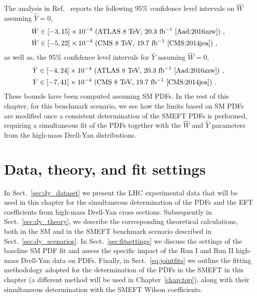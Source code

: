 \documentclass[withindex,glossary]{cam-thesis}
\begin{document}
The analysis in Ref.~\cite{Farina:2016rws} reports the following 95\% confidence level intervals on $\hat{W}$ assuming $\hat{Y}=0$,
\begin{equation}
\begin{split}
\hat W &\in \left[ - 3, 15 \right]\times 10^{-4}~\textrm{(ATLAS 8 TeV, 20.3 fb$^{-1}$~\cite{Aad:2016zzw})}~,\\
\hat W &\in \left[ - 5, 22 \right]\times 10^{-4}~\textrm{(CMS 8 TeV, 19.7 fb$^{-1}$~\cite{CMS:2014jea})}~,
\end{split}
\end{equation} 
as well as, the 95\% confidence level intervals for $\hat{Y}$ assuming $\hat{W}=0$,
\begin{equation}
\begin{split}
\hat Y &\in \left[ - 4, 24 \right]\times 10^{-4}~\textrm{(ATLAS 8 TeV, 20.3 fb$^{-1}$~\cite{Aad:2016zzw})}~,\\
\hat Y &\in \left[ - 7, 41 \right]\times 10^{-4}~\textrm{(CMS 8 TeV, 19.7 fb$^{-1}$~\cite{CMS:2014jea})}~.
\end{split}
\end{equation}
These bounds have been computed assuming SM PDFs. In the rest of this chapter,
for this benchmark scenario, we see how the limits based on SM PDFs
are modified once a consistent determination of the SMEFT PDFs is
performed, requiring a simultaneous fit of the PDFs together with the
$\hat{W}$ and $\hat{Y}$ parameters from the high-mass Drell-Yan distributions. 


\section{Data, theory, and fit settings}
\label{sec:dy_data}

In Sect.~\ref{sec:dy_dataset} we present the LHC experimental data  that will be used in this chapter
for the simultaneous determination of the PDFs and
the EFT coefficients from high-mass Drell-Yan cross sections.
%
Subsequently in Sect.~\ref{sec:dy_theory}, we describe the corresponding theoretical calculations, both in the SM
and in the SMEFT benchmark scenario described in Sect.~\ref{sec:dy_scenarios}.
%
In Sect.~\ref{sec:fitsettings} we  discuss the settings of the baseline SM PDF fit and assess the
specific impact of the Run I and Run II high-mass Drell-Yan data on PDFs.
%
Finally, in Sect.~\ref{eq:jointfits} we outline the fitting methodology adopted for
the determination of the PDFs in the SMEFT in this chapter (a different method will be
used in Chapter~\ref{chap:top}), along with their
simultaneous determination with the SMEFT Wilson coefficients.
\end{document}
